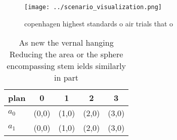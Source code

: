 \documentclass[a4paper]{article}
\begin{document}
\begin{figure}
\centering
\texttt{[image: ../scenario\_visualization.png]}
\caption{ copenhagen highest standards o air trials that o
}
\end{figure}
 
\begin{table}
\begin{adjustbox}{width=0.5\columnwidth}
\begin{tabular}{|l|l|l|l|l|}
\hline
\textbf{plan} & \multicolumn{1}{c|}{\textbf{0}} & \multicolumn{1}{c|}{\textbf{1}} & \multicolumn{1}{c|}{\textbf{2}} & \multicolumn{1}{c|}{\textbf{3}} \\ \hline
\textbf{$a_0$}  & (0,0) & (1,0) & (2,0) & (3,0) \\ \hline
\textbf{$a_1$}  & (0,0) & (1,0) & (2,0) & (3,0) \\ \hline
\end{tabular}
\end{adjustbox}
\caption{As new the vernal hanging Reducing the area or the sphere encompassing stem ields similarly in part
}
\end{table}
\end{document}
